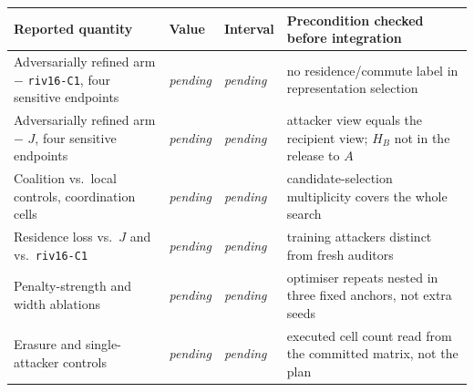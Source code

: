\begin{tabular}{@{}p{4.6cm}p{3.0cm}p{3.0cm}p{4.4cm}@{}}
\toprule
Reported quantity & Value & Interval & Precondition checked before integration \\
\midrule
Adversarially refined arm $-$ \texttt{riv16-C1}, four sensitive endpoints & \emph{pending} & \emph{pending} & no residence/commute label in representation selection \\
Adversarially refined arm $-$ $J$, four sensitive endpoints & \emph{pending} & \emph{pending} & attacker view equals the recipient view; $H_B$ not in the release to $A$ \\
Coalition vs.\ local controls, coordination cells & \emph{pending} & \emph{pending} & candidate-selection multiplicity covers the whole search \\
Residence loss vs.\ $J$ and vs.\ \texttt{riv16-C1} & \emph{pending} & \emph{pending} & training attackers distinct from fresh auditors \\
Penalty-strength and width ablations & \emph{pending} & \emph{pending} & optimiser repeats nested in three fixed anchors, not extra seeds \\
Erasure and single-attacker controls & \emph{pending} & \emph{pending} & executed cell count read from the committed matrix, not the plan \\
\bottomrule
\end{tabular}
